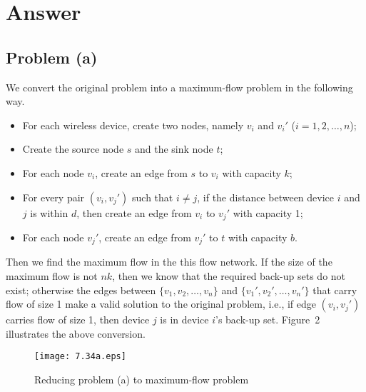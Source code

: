 \documentclass[12pt,letterpaper]{article}
\begin{document}
\section*{Answer}

\subsection*{Problem (a)}
We convert the original problem into a maximum-flow problem in the following way.
\begin{itemize}
\item For each wireless device, create two nodes, namely $v_i$ and $v_i'$ ($i=1, 2, \dots, n$);
\item Create the source node $s$ and the sink node $t$;
\item For each node $v_i$, create an edge from $s$ to $v_i$ with capacity $k$;
\item For every pair $(v_i, v_j')$ such that $i \ne j$, if the distance between device $i$ and $j$ is within $d$, then create an edge from $v_i$ to $v_j'$ with capacity 1;
\item For each node $v_j'$, create an edge from $v_j'$ to $t$ with capacity $b$.
\end{itemize}

Then we find the maximum flow in the this flow network. If the size of the maximum flow is not $nk$, then we know that the required back-up sets do not exist; otherwise the edges between $\{v_1, v_2, \dots, v_n\}$ and $\{v_1', v_2', \dots, v_n'\}$ that carry flow of size 1 make a valid solution to the original problem, i.e., if edge $(v_i, v_j')$ carries flow of size 1, then device $j$ is in device $i$'s back-up set. Figure~2 illustrates the above conversion.

\begin{figure}
\begin{center}
\texttt{[image: 7.34a.eps]}
\caption{Reducing problem (a) to maximum-flow problem}
\end{center}
\end{figure}
\end{document}
